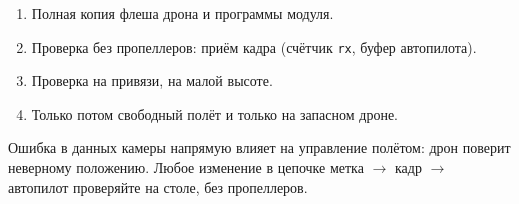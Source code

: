 \begin{enumerate}
  \item Полная копия флеша дрона и программы модуля.
  \item Проверка без пропеллеров: приём кадра (счётчик \texttt{rx}, буфер автопилота).
  \item Проверка на привязи, на малой высоте.
  \item Только потом свободный полёт и только на запасном дроне.
\end{enumerate}

\begin{opasno}
Ошибка в данных камеры напрямую влияет на управление полётом: дрон поверит неверному положению. Любое изменение в цепочке метка $\to$ кадр $\to$ автопилот проверяйте на столе, без пропеллеров.
\end{opasno}
